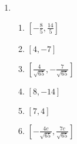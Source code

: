 \documentclass{article}
\begin{document}
\begin{enumerate}
\begin{enumerate}
	\end{enumerate}
	
\item
	
	\begin{enumerate}
	
	\item $[ -\frac{8}{5}, \frac{14}{5} ]$
	
	\item $[4, -7]$
	
	\item $[ \frac{4}{\sqrt{65}}, -\frac{7}{\sqrt{65}}]$
	
	\item $[8, -14]$
	
	\item $[7, 4]$
	
	\item $[-\frac{4c}{\sqrt{65}}, \frac{7c}{\sqrt{65}}]$
	
	\end{enumerate}

\end{enumerate}
\end{document}
